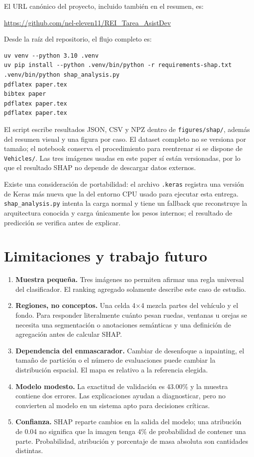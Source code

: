 \documentclass[11pt,a4paper]{article}
\begin{document}
El URL canónico del proyecto, incluido también en el resumen, es:
\begin{center}
\url{https://github.com/nel-eleven11/REI_Tarea_AsistDev}
\end{center}

Desde la raíz del repositorio, el flujo completo es:

\begin{lstlisting}
uv venv --python 3.10 .venv
uv pip install --python .venv/bin/python -r requirements-shap.txt
.venv/bin/python shap_analysis.py
pdflatex paper.tex
bibtex paper
pdflatex paper.tex
pdflatex paper.tex
\end{lstlisting}

El script escribe resultados JSON, CSV y NPZ dentro de
\texttt{figures/shap/}, además del resumen visual y una figura por caso. El
dataset completo no se versiona por tamaño; el
notebook conserva el procedimiento para reentrenar si se dispone de
\texttt{Vehicles/}. Las tres imágenes usadas en este paper sí están
versionadas, por lo que el resultado SHAP no depende de descargar datos
externos.

Existe una consideración de portabilidad: el archivo \texttt{.keras} registra una
versión de Keras más nueva que la del entorno CPU usado para ejecutar esta
entrega. \texttt{shap\_analysis.py} intenta la carga normal y tiene un fallback que
reconstruye la arquitectura conocida y carga únicamente los pesos internos;
el resultado de predicción se verifica antes de explicar.

\section{Limitaciones y trabajo futuro}

\begin{enumerate}[leftmargin=*]
  \item \textbf{Muestra pequeña.} Tres imágenes no permiten afirmar una
  regla universal del clasificador. El ranking agregado solamente describe
  este caso de estudio.
  \item \textbf{Regiones, no conceptos.} Una celda 4$\times$4 mezcla partes
  del vehículo y el fondo. Para responder literalmente cuánto pesan ruedas,
  ventanas u orejas se necesita una segmentación o anotaciones semánticas y
  una definición de agregación antes de calcular SHAP.
  \item \textbf{Dependencia del enmascarador.} Cambiar de desenfoque a
  inpainting, el tamaño de partición o el número de evaluaciones puede cambiar
  la distribución espacial. El mapa es relativo a la referencia elegida.
  \item \textbf{Modelo modesto.} La exactitud de validación es 43.00\% y la
  muestra contiene dos errores. Las explicaciones ayudan a diagnosticar, pero
  no convierten al modelo en un sistema apto para decisiones críticas.
  \item \textbf{Confianza.} SHAP reparte cambios en la salida del modelo; una
  atribución de 0.04 no significa que la imagen tenga 4\% de probabilidad de
  contener una parte. Probabilidad, atribución y porcentaje de masa absoluta
  son cantidades distintas.
\end{enumerate}
\end{document}
